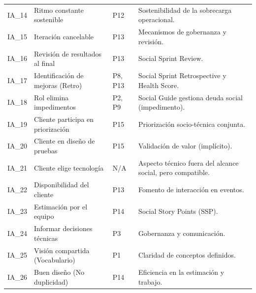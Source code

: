 \begin{longtable}[H]{
    >{\raggedright\arraybackslash}p{1.2cm}
    >{\raggedright\arraybackslash}p{6.5cm}
    >{\centering\arraybackslash}p{1.5cm}
    >{\raggedright\arraybackslash}p{3.8cm}
    }
    IA\_14       & Ritmo constante sostenible               & P12               & Sostenibilidad de la sobrecarga operacional.                                 \\
    IA\_15       & Iteración cancelable                     & P13               & Mecanismos de gobernanza y revisión.                                         \\
    IA\_16       & Revisión de resultados al final          & P13               & Social Sprint Review.                                                        \\
    IA\_17       & Identificación de mejoras (Retro)        & P8, P13           & Social Sprint Retrospective y Health Score.                                  \\
    IA\_18       & Rol elimina impedimentos                 & P2, P9            & Social Guide gestiona deuda social (impedimento).                            \\
    IA\_19       & Cliente participa en priorización        & P15               & Priorización socio-técnica conjunta.                                         \\
    IA\_20       & Cliente en diseño de pruebas             & P15               & Validación de valor (implícito).                                             \\
    IA\_21       & Cliente elige tecnología                 & N/A               & Aspecto técnico fuera del alcance social, pero compatible.                   \\
    IA\_22       & Disponibilidad del cliente               & P13               & Fomento de interacción en eventos.                                           \\
    IA\_23       & Estimación por el equipo                 & P14               & Social Story Points (SSP).                                                   \\
    IA\_24       & Informar decisiones técnicas             & P3                & Gobernanza y comunicación.                                                   \\
    IA\_25       & Visión compartida (Vocabulario)          & P1                & Claridad de conceptos definidos.                                             \\
    IA\_26       & Buen diseño (No duplicidad)              & P14               & Eficiencia en la estimación y trabajo.                                       \\

\end{longtable}
